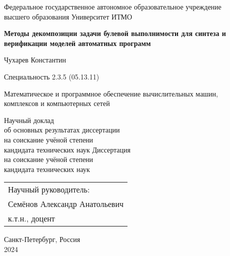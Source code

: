 \thispagestyle{empty}

\begin{center}
    Федеральное государственное автономное образовательное учреждение \\
    высшего образования Университет ИТМО
\end{center}

\vspace{0pt plus2fill}

\begin{center}

\textbf{\large
Методы декомпозиции задачи булевой выполнимости для синтеза и верификации моделей автоматных программ
}

\vspace{1cm}

{\large
    Чухарев Константин
}

\vspace{1cm}

Специальность 2.3.5 (05.13.11)
\begin{SingleSpace*}
    \small
    Математическое и программное обеспечение вычислительных машин, \\
    комплексов и компьютерных сетей
\end{SingleSpace*}

\vspace{1cm}

\ifsynopsis
Научный доклад \\
об основных результатах диссертации \\
на соискание учёной степени \\
кандидата технических наук
\else
Диссертация \\
на соискание учёной степени \\
кандидата технических наук
\fi

\end{center}

\vspace{0pt plus1fill}

\hfill\begin{tabular}{l}
Научный руководитель: \\
Семёнов Александр Анатольевич \\
к.т.н., доцент
\end{tabular}

\vspace{0pt plus1fill}

\begin{center}
    Санкт-Петербург, Россия \\
    2024
\end{center}
